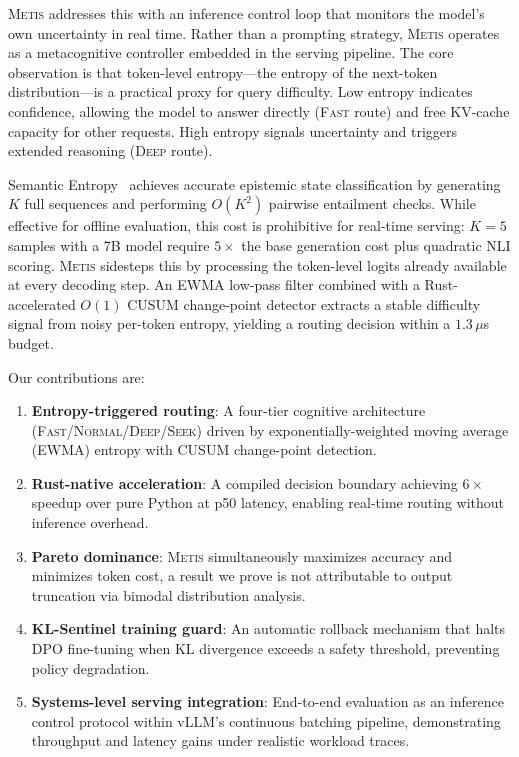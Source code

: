 \documentclass[11pt,a4paper]{article}
\newcommand{\metis}{\textsc{Metis}}
\begin{document}
\metis{} addresses this with an inference control loop that monitors the model's own uncertainty in real time. Rather than a prompting strategy, \metis{} operates as a metacognitive controller embedded in the serving pipeline. The core observation is that token-level entropy---the entropy of the next-token distribution---is a practical proxy for query difficulty. Low entropy indicates confidence, allowing the model to answer directly (\textsc{Fast} route) and free KV-cache capacity for other requests. High entropy signals uncertainty and triggers extended reasoning (\textsc{Deep} route).

Semantic Entropy~\citep{kuhn2023semantic} achieves accurate epistemic state classification by generating $K$ full sequences and performing $O(K^2)$ pairwise entailment checks. While effective for offline evaluation, this cost is prohibitive for real-time serving: $K{=}5$ samples with a 7B model require $5\times$ the base generation cost plus quadratic NLI scoring. \metis{} sidesteps this by processing the token-level logits already available at every decoding step. An EWMA low-pass filter combined with a Rust-accelerated $O(1)$ CUSUM change-point detector extracts a stable difficulty signal from noisy per-token entropy, yielding a routing decision within a $1.3\,\mu$s budget.

Our contributions are:
\begin{enumerate}[leftmargin=*,itemsep=2pt]
    \item \textbf{Entropy-triggered routing}: A four-tier cognitive architecture (\textsc{Fast}/\textsc{Normal}/\textsc{Deep}/\textsc{Seek}) driven by exponentially-weighted moving average (EWMA) entropy with CUSUM change-point detection.
    \item \textbf{Rust-native acceleration}: A compiled decision boundary achieving $6\times$ speedup over pure Python at p50 latency, enabling real-time routing without inference overhead.
    \item \textbf{Pareto dominance}: \metis{} simultaneously maximizes accuracy and minimizes token cost, a result we prove is not attributable to output truncation via bimodal distribution analysis.
    \item \textbf{KL-Sentinel training guard}: An automatic rollback mechanism that halts DPO fine-tuning when KL divergence exceeds a safety threshold, preventing policy degradation.
    \item \textbf{Systems-level serving integration}: End-to-end evaluation as an inference control protocol within vLLM's continuous batching pipeline, demonstrating throughput and latency gains under realistic workload traces.
\end{enumerate}
\end{document}
